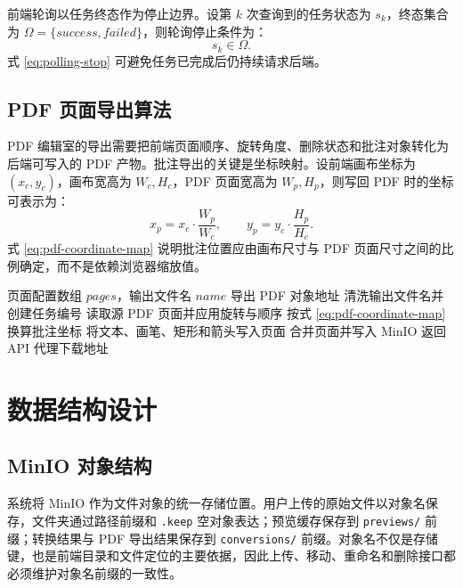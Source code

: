 前端轮询以任务终态作为停止边界。设第 $k$ 次查询到的任务状态为 $s_k$，终态集合为 $\Omega=\{success,failed\}$，则轮询停止条件为：
\begin{equation}
  s_k \in \Omega.
  \label{eq:polling-stop}
\end{equation}
式 \ref{eq:polling-stop} 可避免任务已完成后仍持续请求后端。

\subsection{PDF 页面导出算法}

PDF 编辑室的导出需要把前端页面顺序、旋转角度、删除状态和批注对象转化为后端可写入的 PDF 产物。批注导出的关键是坐标映射。设前端画布坐标为 $(x_c,y_c)$，画布宽高为 $W_c,H_c$，PDF 页面宽高为 $W_p,H_p$，则写回 PDF 时的坐标可表示为：
\begin{equation}
  x_p=x_c\cdot\frac{W_p}{W_c},\qquad
  y_p=y_c\cdot\frac{H_p}{H_c}.
  \label{eq:pdf-coordinate-map}
\end{equation}
式 \ref{eq:pdf-coordinate-map} 说明批注位置应由画布尺寸与 PDF 页面尺寸之间的比例确定，而不是依赖浏览器缩放值。

\begin{algorithm}[H]
  \caption{PDF 页面重组与批注导出算法}
  \label{alg:pdf-export}
  \renewcommand{\algorithmicrequire}{\textbf{输入：}}
  \renewcommand{\algorithmicensure}{\textbf{输出：}}
  \begin{algorithmic}[1]
    \Require 页面配置数组 $pages$，输出文件名 $name$
    \Ensure 导出 PDF 对象地址
    \State 清洗输出文件名并创建任务编号
      \State 读取源 PDF 页面并应用旋转与顺序
      \State 按式 \ref{eq:pdf-coordinate-map} 换算批注坐标
      \State 将文本、画笔、矩形和箭头写入页面
    \EndFor
    \State 合并页面并写入 MinIO
    \State 返回 API 代理下载地址
  \end{algorithmic}
\end{algorithm}

\section{数据结构设计}

\subsection{MinIO 对象结构}

系统将 MinIO 作为文件对象的统一存储位置。用户上传的原始文件以对象名保存，文件夹通过路径前缀和 \texttt{.keep} 空对象表达；预览缓存保存到 \texttt{previews/} 前缀；转换结果与 PDF 导出结果保存到 \texttt{conversions/} 前缀。对象名不仅是存储键，也是前端目录和文件定位的主要依据，因此上传、移动、重命名和删除接口都必须维护对象名前缀的一致性。


